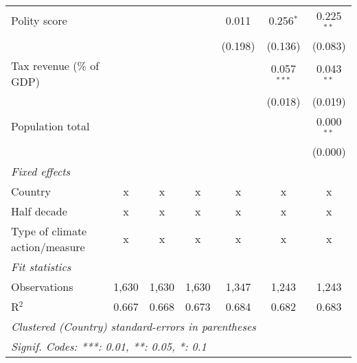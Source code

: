 \begin{tabular}{lcccccc}
   Polity score                                             &             &              &                & 0.011          & 0.256$^{*}$    & 0.225$^{**}$\\   
                                                            &             &              &                & (0.198)        & (0.136)        & (0.083)\\   
   Tax revenue (\% of GDP)                                  &             &              &                &                & 0.057$^{***}$  & 0.043$^{**}$\\   
                                                            &             &              &                &                & (0.018)        & (0.019)\\   
   Population total                                         &             &              &                &                &                & 0.000$^{**}$\\   
                                                            &             &              &                &                &                & (0.000)\\   
   \emph{Fixed effects}\\
   Country                                                  & x           & x            & x              & x              & x              & x\\  
   Half decade                                              & x           & x            & x              & x              & x              & x\\  
   Type of climate action/measure                           & x           & x            & x              & x              & x              & x\\  
   \midrule \emph{Fit statistics}\\
   Observations                                             & 1,630       & 1,630        & 1,630          & 1,347          & 1,243          & 1,243\\  
   R$^2$                                                    & 0.667       & 0.668        & 0.673          & 0.684          & 0.682          & 0.683\\  
   \midrule
   \multicolumn{7}{l}{\emph{Clustered (Country) standard-errors in parentheses}}\\
   \multicolumn{7}{l}{\emph{Signif. Codes: ***: 0.01, **: 0.05, *: 0.1}}\\
\end{tabular}
\par\endgroup


